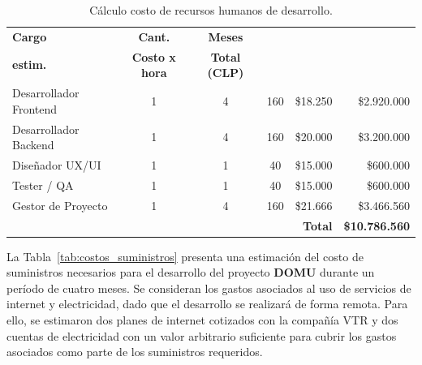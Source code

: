 {\begin{table}[H]

    \centering
    
    \caption{Cálculo costo de recursos humanos de desarrollo.}
    
    \label{tab:costos_rrhh}
    
    {\small\setlength{\tabcolsep}{3pt}
    \renewcommand{\arraystretch}{1.1}
    
    \begin{tabular}{|p{}|c|c|c|r|r|}
    
    \hline
    \textbf{Cargo} & \textbf{Cant.} & \textbf{Meses} & \shortstack{\textbf{Horas}\\\textbf{estim.}} & \textbf{Costo x hora} & \textbf{Total (CLP)}\\
    \hline
    
    Desarrollador Frontend & 1 & 4 & 160 & \$18.250 & \$2.920.000\\
    Desarrollador Backend  & 1 & 4 & 160 & \$20.000 & \$3.200.000\\
    Diseñador UX/UI        & 1 & 1 &  40 & \$15.000 &   \$600.000\\
    Tester / QA            & 1 & 1 &  40 & \$15.000 &   \$600.000\\
    Gestor de Proyecto     & 1 & 4 & 160 & \$21.666 & \$3.466.560\\
    \hline
    \multicolumn{5}{|r|}{\textbf{Total}} & \textbf{\$10.786.560}\\
    \hline
    
    \end{tabular}
    } %
\end{table}


La Tabla~\ref{tab:costos_suministros} presenta una estimación del costo de suministros necesarios para el desarrollo del proyecto \textbf{DOMU} durante un período de cuatro meses. Se consideran los gastos asociados al uso de servicios de internet y electricidad, dado que el desarrollo se realizará de forma remota. Para ello, se estimaron dos planes de internet cotizados con la compañía VTR y dos cuentas de electricidad con un valor arbitrario suficiente para cubrir los gastos asociados como parte de los suministros requeridos.


}
